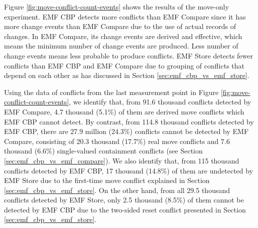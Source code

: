 %
%
%
%
%


Figure \ref{fig:move-conflict-count-events} shows the results of the move-only experiment. EMF CBP detects more conflicts than EMF Compare since it has more change events than EMF Compare due to the use of actual records of changes. In EMF Compare, its change events are derived and effective, which means the minimum number of change events are produced. Less number of change events means less probable to produce conflicts. EMF Store detects fewer conflicts than EMF CBP and EMF Compare due to grouping of conflicts that depend on each other as has discussed in Section \ref{sec:emf_cbp_vs_emf_store}.

Using the data of conflicts from the last measurement point in Figure \ref{fig:move-conflict-count-events}, we identify that, from 91.6 thousand conflicts detected by EMF Compare, 4.7 thousand (5.1\%) of them are derived move conflicts which EMF CBP cannot detect. By contrast, from 114.8 thousand conflicts detected by EMF CBP, there are 27.9 million (24.3\%) conflicts cannot be detected by EMF Compare, consisting of 20.3 thousand (17.7\%) real move conflicts and 7.6 thousand (6.6\%) single-valued containment conflicts (see Section \ref{sec:emf_cbp_vs_emf_compare}). We also identify that, from 115 thousand conflicts detected by EMF CBP, 17 thousand (14.8\%) of them are undetected by EMF Store due to the first-time move conflict explained in Section \ref{sec:emf_cbp_vs_emf_store}. On the other hand, from all 29.5 thousand conflicts detected by EMF Store, only 2.5 thousand (8.5\%) of them cannot be detected by EMF CBP due to the two-sided reset conflict presented in Section \ref{sec:emf_cbp_vs_emf_store}.


